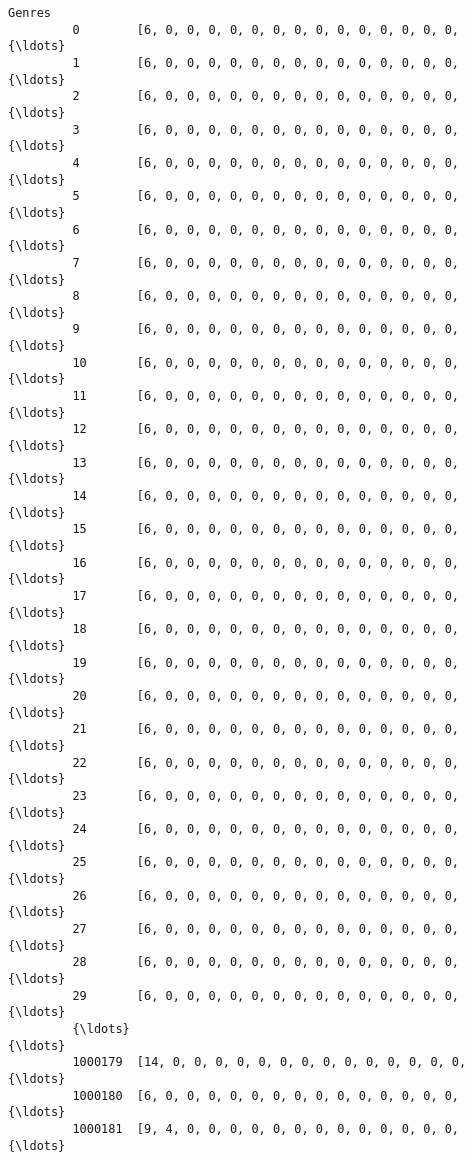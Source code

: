 \documentclass[11pt]{article}
\begin{document}
\begin{Verbatim}[commandchars=\\\{\}]
                                                             Genres  
         0        [6, 0, 0, 0, 0, 0, 0, 0, 0, 0, 0, 0, 0, 0, 0, {\ldots}  
         1        [6, 0, 0, 0, 0, 0, 0, 0, 0, 0, 0, 0, 0, 0, 0, {\ldots}  
         2        [6, 0, 0, 0, 0, 0, 0, 0, 0, 0, 0, 0, 0, 0, 0, {\ldots}  
         3        [6, 0, 0, 0, 0, 0, 0, 0, 0, 0, 0, 0, 0, 0, 0, {\ldots}  
         4        [6, 0, 0, 0, 0, 0, 0, 0, 0, 0, 0, 0, 0, 0, 0, {\ldots}  
         5        [6, 0, 0, 0, 0, 0, 0, 0, 0, 0, 0, 0, 0, 0, 0, {\ldots}  
         6        [6, 0, 0, 0, 0, 0, 0, 0, 0, 0, 0, 0, 0, 0, 0, {\ldots}  
         7        [6, 0, 0, 0, 0, 0, 0, 0, 0, 0, 0, 0, 0, 0, 0, {\ldots}  
         8        [6, 0, 0, 0, 0, 0, 0, 0, 0, 0, 0, 0, 0, 0, 0, {\ldots}  
         9        [6, 0, 0, 0, 0, 0, 0, 0, 0, 0, 0, 0, 0, 0, 0, {\ldots}  
         10       [6, 0, 0, 0, 0, 0, 0, 0, 0, 0, 0, 0, 0, 0, 0, {\ldots}  
         11       [6, 0, 0, 0, 0, 0, 0, 0, 0, 0, 0, 0, 0, 0, 0, {\ldots}  
         12       [6, 0, 0, 0, 0, 0, 0, 0, 0, 0, 0, 0, 0, 0, 0, {\ldots}  
         13       [6, 0, 0, 0, 0, 0, 0, 0, 0, 0, 0, 0, 0, 0, 0, {\ldots}  
         14       [6, 0, 0, 0, 0, 0, 0, 0, 0, 0, 0, 0, 0, 0, 0, {\ldots}  
         15       [6, 0, 0, 0, 0, 0, 0, 0, 0, 0, 0, 0, 0, 0, 0, {\ldots}  
         16       [6, 0, 0, 0, 0, 0, 0, 0, 0, 0, 0, 0, 0, 0, 0, {\ldots}  
         17       [6, 0, 0, 0, 0, 0, 0, 0, 0, 0, 0, 0, 0, 0, 0, {\ldots}  
         18       [6, 0, 0, 0, 0, 0, 0, 0, 0, 0, 0, 0, 0, 0, 0, {\ldots}  
         19       [6, 0, 0, 0, 0, 0, 0, 0, 0, 0, 0, 0, 0, 0, 0, {\ldots}  
         20       [6, 0, 0, 0, 0, 0, 0, 0, 0, 0, 0, 0, 0, 0, 0, {\ldots}  
         21       [6, 0, 0, 0, 0, 0, 0, 0, 0, 0, 0, 0, 0, 0, 0, {\ldots}  
         22       [6, 0, 0, 0, 0, 0, 0, 0, 0, 0, 0, 0, 0, 0, 0, {\ldots}  
         23       [6, 0, 0, 0, 0, 0, 0, 0, 0, 0, 0, 0, 0, 0, 0, {\ldots}  
         24       [6, 0, 0, 0, 0, 0, 0, 0, 0, 0, 0, 0, 0, 0, 0, {\ldots}  
         25       [6, 0, 0, 0, 0, 0, 0, 0, 0, 0, 0, 0, 0, 0, 0, {\ldots}  
         26       [6, 0, 0, 0, 0, 0, 0, 0, 0, 0, 0, 0, 0, 0, 0, {\ldots}  
         27       [6, 0, 0, 0, 0, 0, 0, 0, 0, 0, 0, 0, 0, 0, 0, {\ldots}  
         28       [6, 0, 0, 0, 0, 0, 0, 0, 0, 0, 0, 0, 0, 0, 0, {\ldots}  
         29       [6, 0, 0, 0, 0, 0, 0, 0, 0, 0, 0, 0, 0, 0, 0, {\ldots}  
         {\ldots}                                                    {\ldots}  
         1000179  [14, 0, 0, 0, 0, 0, 0, 0, 0, 0, 0, 0, 0, 0, 0,{\ldots}  
         1000180  [6, 0, 0, 0, 0, 0, 0, 0, 0, 0, 0, 0, 0, 0, 0, {\ldots}  
         1000181  [9, 4, 0, 0, 0, 0, 0, 0, 0, 0, 0, 0, 0, 0, 0, {\ldots}  

\end{Verbatim}
\end{document}
